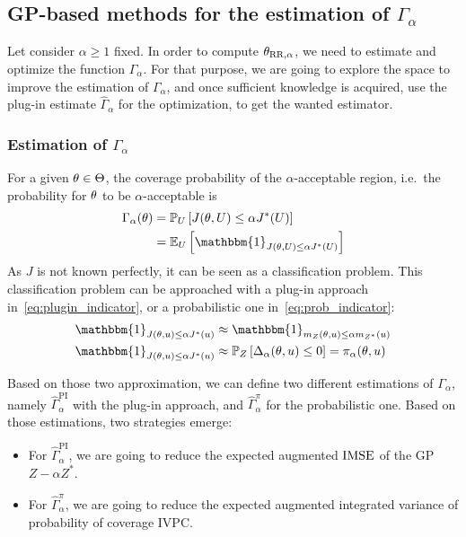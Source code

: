 \documentclass[../../Main_ManuscritThese.tex]{subfiles}
\begin{document}
\subsection{GP-based methods for the estimation of $\Gamma_{\alpha}$}
\label{sec:evaluation_gamma}
Let consider $\alpha\geq 1$ fixed. In order to compute
${\theta}_{\mathrm{RR, \alpha}}$, we need to estimate and optimize the
function $\Gamma_{\alpha}$. For that purpose, we are going to explore
the space to improve the estimation of $\Gamma_{\alpha}$, and once
sufficient knowledge is acquired, use the plug-in %
estimate $\hat{\Gamma}_{\alpha}$ for the optimization, to get the
wanted estimator.

\subsubsection{Estimation of $\Gamma_{\alpha}$}

For a given $\theta\in\Theta$, the coverage probability of the
$\alpha$-acceptable region, i.e.\ the probability for $\theta$ to be
$\alpha$-acceptable is
\begin{align}
  \Gamma_{\alpha}(\kk)  & = \Prob_{U}\left[J(\kk,\UU) \leq \alpha J^*(\UU)\right] \\
                      & =\Ex_{U}\left[\mathbbm{1}_{J(\kk,\UU) \leq \alpha J^*(\UU)}\right]
\end{align}
As $J$ is not known perfectly, it can be seen as a classification
problem.  This classification problem can be approached with a plug-in
approach in~\cref{eq:plugin_indicator}, or a probabilistic one
in~\cref{eq:prob_indicator}:
\begin{align}
  \mathbbm{1}_{J(\kk,\uu) \leq \alpha J^*(\uu)} & \approx   \mathbbm{1}_{m_Z(\kk,\uu) \leq \alpha m_{{Z^*}}(\uu)} \label{eq:plugin_indicator} \\
  \mathbbm{1}_{J(\kk,\uu) \leq \alpha J^*(\uu)} & \approx   \Prob_{Z}\left[ \Delta_{\alpha}(\kk,\uu) \leq 0 \right] = \pi_{\alpha}(\kk,\uu) \label{eq:prob_indicator}
\end{align}

Based on those two approximation, we can define two different
estimations of $\Gamma_\alpha$, namely
$\hat{\Gamma}_\alpha^{\mathrm{PI}}$ with the plug-in approach, and
$\hat{\Gamma}_{\alpha}^{\pi}$ for the probabilistic one. Based on
those estimations, two strategies emerge:
\begin{itemize}
\item For $\hat{\Gamma}_{\alpha}^{\mathrm{PI}}$, we are going to
  reduce the expected augmented $\operatorname{\mathrm{IMSE}}$ of the GP $Z - \alpha Z^*$.
\item For $\hat{\Gamma}_{\alpha}^{\pi}$, we are going to reduce the
  expected augmented integrated variance of probability of coverage
  $\mathrm{IVPC}$.
\end{itemize}
\end{document}
